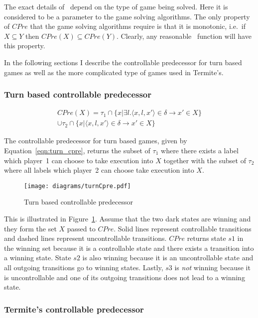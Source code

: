The exact details of \cpre\ depend on the type of game being solved. Here it is considered to be a parameter to the game solving algorithms. The only property of $CPre$ that the game solving algorithms require is that it is monotonic, i.e.\ if $X \subseteq Y$ then $CPre(X) \subseteq CPre(Y)$. Clearly, any reasonable \cpre\ function will have this property.

In the following sections I describe the controllable predecessor for turn based games as well as the more complicated type of games used in Termite's.

\subsubsection{Turn based controllable predecessor}

\begin{multline}
CPre(X) = \tau_1 \cap \{x | \exists l. \langle x, l, x' \rangle \in \delta \rightarrow x' \in X\} \\ \cup \tau_2 \cap \{x | \langle x, l, x' \rangle \in \delta \rightarrow x' \in X \}
\label{eqn:turn_cpre}
\end{multline}

The controllable predecessor for turn based games, given by Equation~\ref{eqn:turn_cpre}, returns the subset of $\tau_1$ where there exists a label which player~1 can choose to take execution into $X$ together with the subset of $\tau_2$ where all labels which player~2 can choose take execution into $X$. 

\begin{figure}[t]
\centering
\texttt{[image: diagrams/turnCpre.pdf]}
\caption{Turn based controllable predecessor}
\label{fig:turn_cpre}
\end{figure}

This is illustrated in Figure~\ref{fig:turn_cpre}. Assume that the two dark states are winning and they form the set $X$ passed to $CPre$. Solid lines represent controllable transitions and dashed lines represent uncontrollable transitions. $CPre$ returns state $s1$ in the winning set because it is a controllable state and there exists a transition into a winning state. State $s2$ is also winning because it is an uncontrollable state and all outgoing transitions go to winning states. Lastly, $s3$ is \emph{not} winning because it is uncontrollable and one of its outgoing transitions does not lead to a winning state.

\subsubsection{Termite's controllable predecessor}
\label{sec:termite_cpre}

